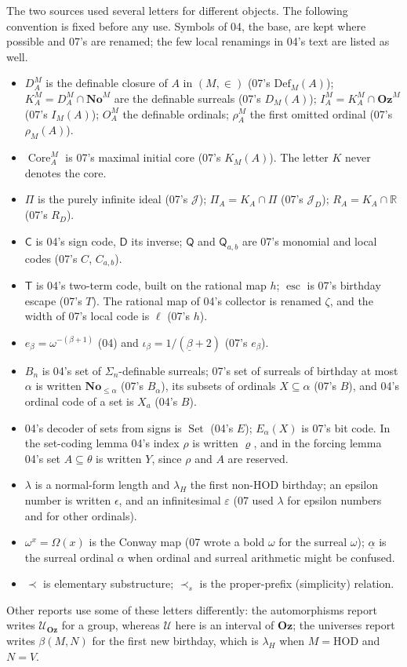\documentclass[11pt,a4paper]{article}
\numberwithin{equation}{section}
\theoremstyle{definition}
\theoremstyle{remark}
\newcommand{\No}{\mathbf{No}}
\newcommand{\Oz}{\mathbf{Oz}}
\newcommand{\HOD}{\mathrm{HOD}}
\newcommand{\R}{\mathbb R}
\newcommand{\Def}{\mathrm{Def}}
\newcommand{\Code}{\mathsf C}
\newcommand{\Decode}{\mathsf D}
\newcommand{\Two}{\mathsf T}
\newcommand{\Mc}{\mathsf Q}
\newcommand{\esc}{\operatorname{esc}}
\newcommand{\SetDec}{\operatorname{Set}}
\newcommand{\Core}{\operatorname{Core}}
\newcommand{\Cell}{\mathcal U}
\newcommand{\ps}{\mathrel{\prec_s}}
\begin{document}
The two sources used several letters for different objects. The
following convention is fixed before any use. Symbols of 04, the base, are
kept where possible and 07's are renamed; the few local renamings in 04's
text are listed as well.
\begin{itemize}
\item $D^M_A$ is the definable closure of $A$ in $(M,\in)$ (07's
$\Def_M(A)$); $K^M_A=D^M_A\cap\No^M$ are the definable surreals (07's
$D_M(A)$); $I^M_A=K^M_A\cap\Oz^M$ (07's $I_M(A)$); $O^M_A$ the definable
ordinals; $\rho^M_A$ the first omitted ordinal (07's $\rho_M(A)$).
\item $\Core^M_A$ is 07's maximal initial core (07's $K_M(A)$). The
letter $K$ never denotes the core.
\item $\Pi$ is the purely infinite ideal (07's $\mathcal J$); $\Pi_A=
K_A\cap\Pi$ (07's $\mathcal J_D$); $R_A=K_A\cap\R$ (07's $R_D$).
\item $\Code$ is 04's sign code, $\Decode$ its inverse; $\Mc$ and
$\Mc_{a,b}$ are 07's monomial and local codes (07's $C$, $C_{a,b}$).
\item $\Two$ is 04's two-term code, built on the rational map $h$;
$\esc$ is 07's birthday escape (07's $T$). The rational map of 04's
collector is renamed $\zeta$, and the width of 07's local code is $\ell$
(07's $h$).
\item $e_\beta=\omega^{-(\beta+1)}$ (04) and $\iota_\beta=
1/(\underline\beta+2)$ (07's $e_\beta$).
\item $B_n$ is 04's set of $\Sigma_n$-definable surreals; 07's set of
surreals of birthday at most $\alpha$ is written $\No_{\le\alpha}$ (07's
$B_\alpha$), its subsets of ordinals $X\subseteq\alpha$ (07's $B$), and
04's ordinal code of a set is $X_a$ (04's $B$).
\item 04's decoder of sets from signs is $\SetDec$ (04's $E$); $E_\alpha(X)$
is 07's bit code. In the set-coding lemma 04's index $\rho$ is written
$\varrho$, and in the forcing lemma 04's set $A\subseteq\theta$ is written
$Y$, since $\rho$ and $A$ are reserved.
\item $\lambda$ is a normal-form length and $\lambda_H$ the first
non-$\HOD$ birthday; an epsilon number is written $\epsilon$, and an
infinitesimal $\varepsilon$ (07 used $\lambda$ for epsilon numbers and for
other ordinals).
\item $\omega^x=\Omega(x)$ is the Conway map (07 wrote a bold $\omega$ for
the surreal $\omega$); $\underline\alpha$ is the surreal ordinal $\alpha$
when ordinal and surreal arithmetic might be confused.
\item $\prec$ is elementary substructure; $\ps$ is the proper-prefix
(simplicity) relation.
\end{itemize}
Other reports use some of these letters differently: the automorphisms
report writes $\mathcal U_{\Oz}$ for a group, whereas $\Cell$ here is an
interval of $\Oz$; the universes report writes $\beta(M,N)$ for the first
new birthday, which is $\lambda_H$ when $M=\HOD$ and $N=V$.
\end{document}
